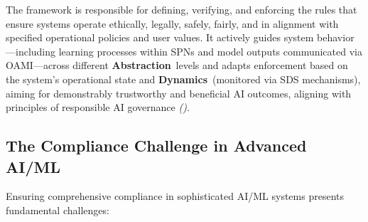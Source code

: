 \documentclass[12pt,a4paper]{report}
\renewcommand{\citep}[1]{\textit{\scriptsize{(\cite{#1})}}}
\newcommand{\Abstraction}{\textbf{Abstraction}}
\newcommand{\Dynamics}{\textbf{Dynamics}}
\begin{document}
	The framework is responsible for defining, verifying, and enforcing the rules that ensure systems operate ethically, legally, safely, fairly, and in alignment with specified operational policies and user values. It actively guides system behavior—including learning processes within SPNs and model outputs communicated via OAMI—across different \Abstraction\ levels and adapts enforcement based on the system's operational state and \Dynamics\ (monitored via SDS mechanisms), aiming for demonstrably trustworthy and beneficial AI outcomes, aligning with principles of responsible AI governance \citep{Responsible_AI_Governance_Review_2024}.
	
	\subsection{The Compliance Challenge in Advanced AI/ML} %
	\label{sec:5-1-1} %
	
	Ensuring comprehensive compliance in sophisticated AI/ML systems presents fundamental challenges:
	
\end{document}
